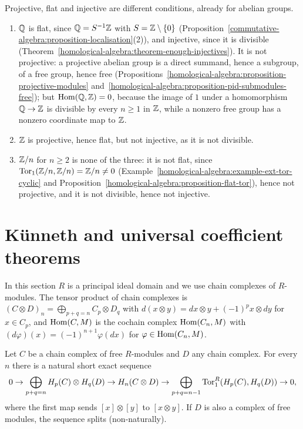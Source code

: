 \begin{counterexample}\label{homological-algebra:counterexample-flat-projective-injective}
Projective, flat and injective are different conditions, already for abelian groups.
\begin{enumerate}
\item $\mathbb{Q}$ is flat, since $\mathbb{Q} = S^{-1}\mathbb{Z}$ with $S = \mathbb{Z} \setminus \{0\}$ (Proposition~\ref{commutative-algebra:proposition-localisation}(2)), and injective, since it is divisible
(Theorem~\ref{homological-algebra:theorem-enough-injectives}). It is not projective: a projective abelian group is a direct summand, hence a subgroup, of a free group, hence free
(Propositions~\ref{homological-algebra:proposition-projective-modules} and~\ref{homological-algebra:proposition-pid-submodules-free}); but $\operatorname{Hom}(\mathbb{Q}, \mathbb{Z}) = 0$, because the image of $1$ under a homomorphism
$\mathbb{Q} \to \mathbb{Z}$ is divisible by every $n \geq 1$ in $\mathbb{Z}$, while a nonzero free group has a nonzero coordinate map to $\mathbb{Z}$.
\item $\mathbb{Z}$ is projective, hence flat, but not injective, as it is not divisible.
\item $\mathbb{Z}/n$ for $n \geq 2$ is none of the three: it is not flat, since $\operatorname{Tor}_1(\mathbb{Z}/n, \mathbb{Z}/n) = \mathbb{Z}/n \neq 0$ (Example~\ref{homological-algebra:example-ext-tor-cyclic} and
Proposition~\ref{homological-algebra:proposition-flat-tor}), hence not projective, and it is not divisible, hence not injective.
\end{enumerate}
\end{counterexample}

\section{K\"unneth and universal coefficient theorems}\label{homological-algebra:section-kunneth}

In this section $R$ is a principal ideal domain and we use chain complexes of $R$-modules. The tensor product of chain
complexes is $(C \otimes D)_n = \bigoplus_{p+q=n}C_p \otimes D_q$ with $d(x \otimes y) = dx \otimes y + (-1)^px \otimes dy$ for $x \in C_p$, and
$\operatorname{Hom}(C, M)$ is the cochain complex $\operatorname{Hom}(C_n, M)$ with $(d\varphi)(x) = (-1)^{n+1}\varphi(dx)$ for $\varphi \in \operatorname{Hom}(C_n, M)$.

\begin{theorem}\label{homological-algebra:theorem-kunneth}
Let $C$ be a chain complex of free $R$-modules and $D$ any chain complex. For every $n$ there is a natural short exact sequence
\[
0 \to \bigoplus_{p+q=n}H_p(C) \otimes H_q(D) \to H_n(C \otimes D) \to \bigoplus_{p+q=n-1}\operatorname{Tor}_1^R(H_p(C), H_q(D)) \to 0,
\]
where the first map sends $[x] \otimes [y]$ to $[x \otimes y]$. If $D$ is also a complex of free modules, the sequence splits
(non-naturally).
\end{theorem}

